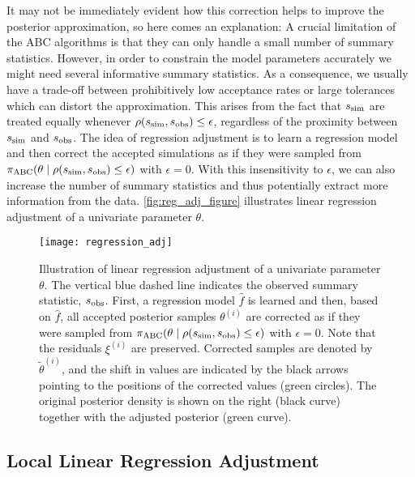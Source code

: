 It may not be immediately evident how this correction helps to improve the posterior approximation, so here comes an explanation: A crucial limitation of the ABC algorithms is that they can only handle a small number of summary statistics. However, in order to constrain the model parameters accurately we might need several informative summary statistics. As a consequence, we usually have a trade-off between prohibitively low acceptance rates or large tolerances which can distort the approximation. This arises from the fact that $s_\mathrm{sim}$ are treated equally whenever $\rho \qty(s_\mathrm{sim}, s_\mathrm{obs}) \leq \epsilon$, regardless of the proximity between $s_\mathrm{sim}$ and $s_\mathrm{obs}$. The idea of regression adjustment is to learn a regression model and then correct the accepted simulations as if they were sampled from $\pi_\mathrm{ABC} \qty(\theta \mid \rho \qty(s_\mathrm{sim}, s_\mathrm{obs}) \leq \epsilon)$ with $\epsilon=0$. With this insensitivity to $\epsilon$, we can also increase the number of summary statistics and thus potentially extract more information from the data. \autoref{fig:reg_adj_figure} illustrates linear regression adjustment of a univariate parameter $\theta$.


\begin{figure}[!htb]
    \centering
    \texttt{[image: regression\_adj]}
    \caption{Illustration of linear regression adjustment of a univariate parameter $\theta$. The vertical blue dashed line indicates the observed summary statistic, $s_\mathrm{obs}$. First, a regression model $\hat{f}$ is learned and then, based on $\hat{f}$, all accepted posterior samples $\theta^{(i)}$ are corrected as if they were sampled from $\pi_\mathrm{ABC} \qty(\theta \mid \rho \qty(s_\mathrm{sim}, s_\mathrm{obs}) \leq \epsilon)$ with $\epsilon=0$. Note that the residuals $\xi^{(i)}$ are preserved. Corrected samples are denoted by $\tilde{\theta}^{(i)}$, and the shift in values are indicated by the black arrows pointing to the positions of the corrected values (green circles). The original posterior density is shown on the right (black curve) together with the adjusted posterior (green curve). 
    }
    \label{fig:reg_adj_figure}
\end{figure}



\subsection{Local Linear Regression Adjustment}

